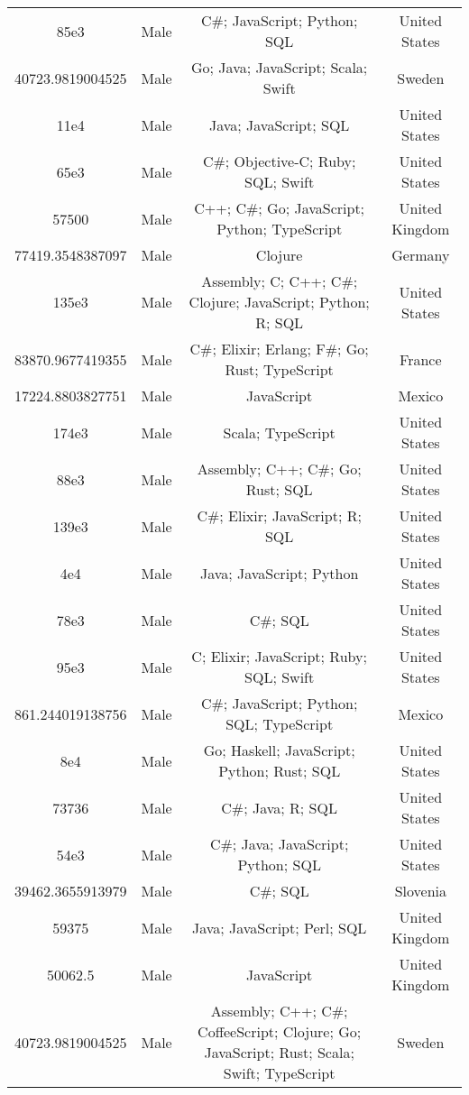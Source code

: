 \begin{center}
\begin{tabular}{ |c|c|c|c| }
85e3  &  Male  &  C\#; JavaScript; Python; SQL  &  United States  \\ 
40723.9819004525  &  Male  &  Go; Java; JavaScript; Scala; Swift  &  Sweden  \\ 
11e4  &  Male  &  Java; JavaScript; SQL  &  United States  \\ 
65e3  &  Male  &  C\#; Objective-C; Ruby; SQL; Swift  &  United States  \\ 
57500  &  Male  &  C++; C\#; Go; JavaScript; Python; TypeScript  &  United Kingdom  \\ 
77419.3548387097  &  Male  &  Clojure  &  Germany  \\ 
135e3  &  Male  &  Assembly; C; C++; C\#; Clojure; JavaScript; Python; R; SQL  &  United States  \\ 
83870.9677419355  &  Male  &  C\#; Elixir; Erlang; F\#; Go; Rust; TypeScript  &  France  \\ 
17224.8803827751  &  Male  &  JavaScript  &  Mexico  \\ 
174e3  &  Male  &  Scala; TypeScript  &  United States  \\ 
88e3  &  Male  &  Assembly; C++; C\#; Go; Rust; SQL  &  United States  \\ 
139e3  &  Male  &  C\#; Elixir; JavaScript; R; SQL  &  United States  \\ 
4e4  &  Male  &  Java; JavaScript; Python  &  United States  \\ 
78e3  &  Male  &  C\#; SQL  &  United States  \\ 
95e3  &  Male  &  C; Elixir; JavaScript; Ruby; SQL; Swift  &  United States  \\ 
861.244019138756  &  Male  &  C\#; JavaScript; Python; SQL; TypeScript  &  Mexico  \\ 
8e4  &  Male  &  Go; Haskell; JavaScript; Python; Rust; SQL  &  United States  \\ 
73736  &  Male  &  C\#; Java; R; SQL  &  United States  \\ 
54e3  &  Male  &  C\#; Java; JavaScript; Python; SQL  &  United States  \\ 
39462.3655913979  &  Male  &  C\#; SQL  &  Slovenia  \\ 
59375  &  Male  &  Java; JavaScript; Perl; SQL  &  United Kingdom  \\ 
50062.5  &  Male  &  JavaScript  &  United Kingdom  \\ 
40723.9819004525  &  Male  &  Assembly; C++; C\#; CoffeeScript; Clojure; Go; JavaScript; Rust; Scala; Swift; TypeScript  &  Sweden  \\ 

\end{tabular}
\end{center}
